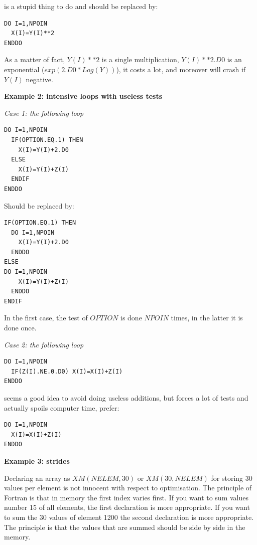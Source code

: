 is a stupid thing to do and should be replaced by:

\begin{lstlisting}
DO I=1,NPOIN
  X(I)=Y(I)**2
ENDDO
\end{lstlisting}

As a matter of fact, $Y(I)**2$ is a single multiplication, $Y(I)**2.D0$ is an
exponential ($exp(2.D0*Log (Y))$), it costs a lot, and moreover will crash if
$Y(I)$ negative.

\textbf{Example 2: intensive loops with useless tests}

\textit{Case 1: the following loop}

\begin{lstlisting}
DO I=1,NPOIN
  IF(OPTION.EQ.1) THEN
    X(I)=Y(I)+2.D0
  ELSE
    X(I)=Y(I)+Z(I)
  ENDIF
ENDDO
\end{lstlisting}

Should be replaced by:

\begin{lstlisting}
IF(OPTION.EQ.1) THEN
  DO I=1,NPOIN
    X(I)=Y(I)+2.D0
  ENDDO
ELSE
DO I=1,NPOIN
    X(I)=Y(I)+Z(I)
  ENDDO
ENDIF
\end{lstlisting}

In the first case, the test of $OPTION$ is done $NPOIN$ times, in the latter it
is done once.

\textit{Case 2: the following loop}
\begin{lstlisting}
DO I=1,NPOIN
  IF(Z(I).NE.0.D0) X(I)=X(I)+Z(I)
ENDDO
\end{lstlisting}

seems a good idea to avoid doing useless additions, but forces a lot of tests
and actually spoils computer time, prefer:

\begin{lstlisting}
DO I=1,NPOIN
  X(I)=X(I)+Z(I)
ENDDO
\end{lstlisting}

\textbf{Example 3: strides}

Declaring an array as $XM(NELEM,30)$ or $XM(30,NELEM)$ for storing 30 values
per element is not innocent with respect to optimisation. The principle of
Fortran is that in memory the first index varies first. If you want to sum
values number 15 of all elements, the first declaration is more appropriate. If
you want to sum the 30 values of element 1200 the second declaration is more
appropriate. The principle is that the values that are summed should be side by
side in the memory.\\

